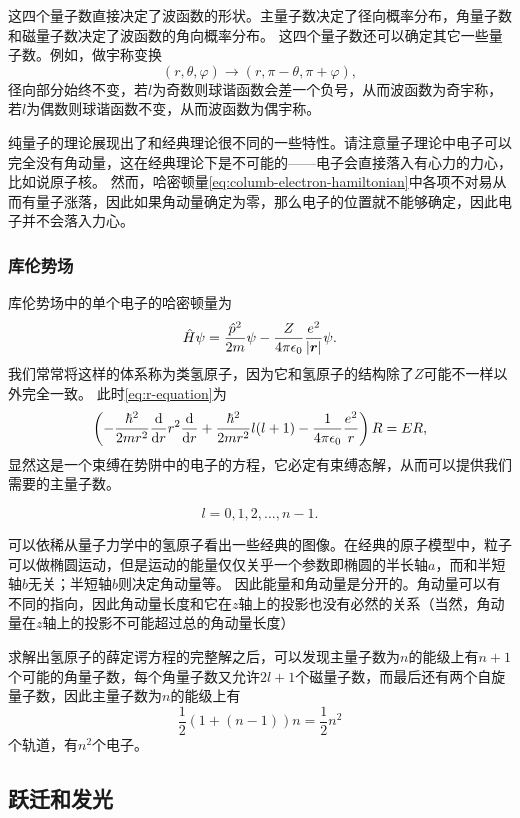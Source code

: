 \documentclass[UTF8, a4paper]{ctexart}
\begin{document}
这四个量子数直接决定了波函数的形状。主量子数决定了径向概率分布，角量子数和磁量子数决定了波函数的角向概率分布。
这四个量子数还可以确定其它一些量子数。例如，做宇称变换
\[
    (r, \theta, \varphi) \longrightarrow (r, \pi - \theta, \pi + \varphi),
\]
径向部分始终不变，若$l$为奇数则球谐函数会差一个负号，从而波函数为奇宇称，若$l$为偶数则球谐函数不变，从而波函数为偶宇称。

纯量子的理论展现出了和经典理论很不同的一些特性。请注意量子理论中电子可以完全没有角动量，这在经典理论下是不可能的——电子会直接落入有心力的力心，比如说原子核。
然而，哈密顿量\eqref{eq:columb-electron-hamiltonian}中各项不对易从而有量子涨落，因此如果角动量确定为零，那么电子的位置就不能够确定，因此电子并不会落入力心。

\subsubsection{库伦势场}

库伦势场中的单个电子的哈密顿量为
\begin{equation}
    \hat{H} \psi = \frac{\hat{p}^2}{2m} \psi - \frac{Z}{4\pi \epsilon_0} \frac{e^2}{\abs{\vb*{r}}} \psi.
    \label{eq:columb-electron-hamiltonian}
\end{equation}
我们常常将这样的体系称为类氢原子，因为它和氢原子的结构除了$Z$可能不一样以外完全一致。
此时\eqref{eq:r-equation}为
\[
    \left( - \frac{\hbar^2}{2m r^2} \dv{r} r^2 \dv{r} + \frac{\hbar^2}{2m r^2} l(l+1) - \frac{1}{4\pi \epsilon_0} \frac{e^2}{r} \right) R = E R,
\]
显然这是一个束缚在势阱中的电子的方程，它必定有束缚态解，从而可以提供我们需要的主量子数。


\[
    l = 0, 1, 2, \ldots, n-1.
\]

可以依稀从量子力学中的氢原子看出一些经典的图像。在经典的原子模型中，粒子可以做椭圆运动，但是运动的能量仅仅关乎一个参数即椭圆的半长轴$a$，而和半短轴$b$无关；半短轴$b$则决定角动量等。
因此能量和角动量是分开的。角动量可以有不同的指向，因此角动量长度和它在$z$轴上的投影也没有必然的关系（当然，角动量在$z$轴上的投影不可能超过总的角动量长度）

求解出氢原子的薛定谔方程的完整解之后，可以发现主量子数为$n$的能级上有$n+1$个可能的角量子数，每个角量子数又允许$2l+1$个磁量子数，而最后还有两个自旋量子数，因此主量子数为$n$的能级上有
\[
    \frac{1}{2} (1 + (n-1)) n = \frac{1}{2}n^2
\]
个轨道，有$n^2$个电子。

\subsection{跃迁和发光}
\end{document}
